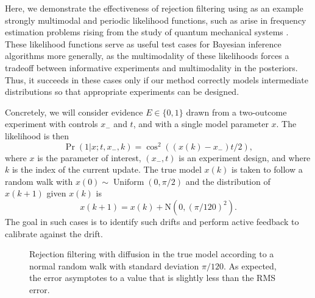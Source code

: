 \documentclass[twoside]{article}
\newcommand{\NN}{\mathrm{N}}
\begin{document}
Here, we demonstrate the effectiveness of rejection filtering using as an
example strongly multimodal and periodic likelihood functions, such as arise
in frequency estimation problems rising from the study of quantum mechanical
systems \cite{ferrie_how_2013,wiebe_efficient_2015}. These likelihood functions serve as useful test cases for
Bayesian inference algorithms more generally, as the multimodality of these
likelihoods forces a tradeoff between informative experiments and
multimodality in the posteriors. Thus, it succeeds in these cases only
if our method correctly models intermediate distributions so that appropriate
experiments can be designed.

Concretely, we will consider evidence $E\in\{0, 1\}$ drawn from a two-outcome
experiment with controls $x_-$ and $t$, and with a single model parameter $x$.
The likelihood is then
\begin{equation}
 \Pr(1 | x; t, x_-,k) = \cos^2((x(k) - x_-) t / 2),
\end{equation}
where $x$ is the parameter of interest, $(x_-, t)$ is an experiment design,
and where $k$ is the index of the current update.  The true model $x(k)$ is taken to
follow a random walk with $x(0)\sim \operatorname{Uniform}(0,\pi/2)$ and the distribution
of $x(k+1)$ given $x(k)$ is
\begin{equation}
    x(k+1)=x(k) + \NN(0,(\pi/120)^2).
\end{equation}
The goal in such cases is to identify such drifts and perform active feedback to calibrate
against the drift.

\begin{figure}
    \caption{
        \label{fig:crej-diffusion}
        Rejection filtering with diffusion in the true model according to
        a normal random walk with standard deviation $\pi / 120$.  As expected, the error asymptotes to a value that is slightly less than the RMS error.
    }
\end{figure}
\end{document}
